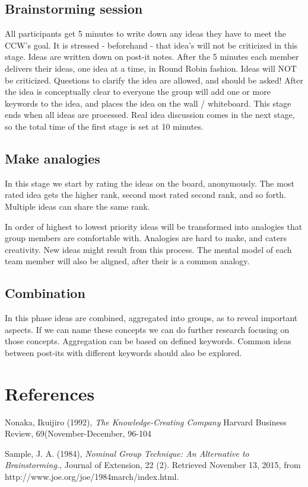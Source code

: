 \section{Brainstorming session}
All participants get 5 minutes to write down any ideas they have to meet the CCW's goal. It is stressed - beforehand - that idea's will not be criticized in this stage. Ideas are written down on post-it notes. After the 5 minutes each member delivers their ideas, one idea at a time, in Round Robin fashion. Ideas will NOT be criticized. Questions to clarify the idea are allowed, and should be asked! After the idea is conceptually clear to everyone the group will add one or more keywords to the idea, and places the idea on the wall / whiteboard. This stage ends when all ideas are processed. Real idea discussion comes in the next stage, so the total time of the first stage is set at 10 minutes.

\section{Make analogies}
In this stage we start by rating the ideas on the board, anonymously. The most rated idea gets the higher rank, second most rated second rank, and so forth. Multiple ideas can share the same rank. 

In order of highest to lowest priority ideas will be transformed into analogies that group members are comfortable with. Analogies are hard to make, and caters creativity. New ideas might result from this process. The mental model of each team member will also be aligned, after their is a common analogy.    

\section{Combination}
In this phase ideas are combined, aggregated into groups, as to reveal important aspects. If we can name these concepts we can do further research focusing on those concepts. Aggregation can be based on defined keywords. Common ideas between post-its with different keywords should also be explored.

\chapter{References}

\begin{thebibliography}{9}
	
	Nonaka, Ikuijiro (1992),
	\textit{The Knowledge-Creating Company}
	Harvard Business Review, 69(November-December, 96-104
	
	Sample, J. A. (1984),
	\textit{Nominal Group Technique: An Alternative to Brainstorming.},
	Journal of Extension, 22 (2). Retrieved November 13,
	2015, from http://www.joe.org/joe/1984march/index.html.
	
	
	
\end{thebibliography}


\appendix



